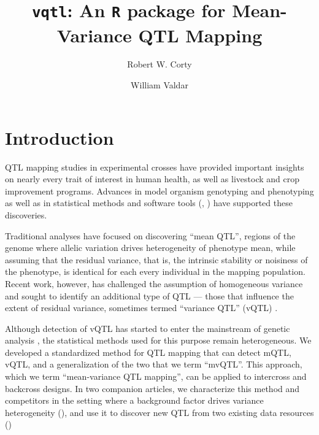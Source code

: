 \documentclass[9pt,twocolumn,twoside]{gsag3jnl}
\title{\texttt{vqtl}: An \texttt{R} package for Mean-Variance QTL Mapping}
\author[$\ast$,1]{Robert W. Corty}
\author[$\ast, 1$]{William Valdar}
\affil[$\ast$]{University of North Carolina at Chapel Hill, Department of Genetics}
\begin{document}
\maketitle
\thispagestyle{firststyle}
\logomark
\articletypemark
\marginmark
\firstpagefootnote
{}
\vspace{-24pt}%



\section*{Introduction}

QTL mapping studies in experimental crosses have provided important insights on nearly every trait of interest in human health, as well as livestock and crop improvement programs.
Advances in model organism genotyping \citep{Williams1990} and phenotyping \citep{Yang2014a} as well as in statistical methods \citep{Lander1989a,Martinez1992} and software tools (\eg, \citealt{Broman2003,Mulligan2017}) have supported these discoveries.

Traditional analyses have focused on discovering ``mean QTL'', regions of the genome where allelic variation drives heterogeneity of phenotype mean, while assuming that the residual variance, that is, the intrinsic stability or noisiness of the phenotype, is identical for each every individual in the mapping population.
Recent work, however, has challenged the assumption of homogeneous variance and sought to identify an additional type of QTL --- those that
influence the extent of residual variance, sometimes termed ``variance QTL'' (vQTL) \citep{Pare2010,Ronnegard2011a,Ronnegard2012,Cao2014}.

Although detection of vQTL has started to enter the mainstream of genetic analysis \citep{Yang2012,Hulse2013,Ayroles2015,Wei2016-lt,Wang2017,Wei2017-tt}, the statistical methods used for this purpose remain heterogeneous.
We developed a standardized method for QTL mapping that can detect mQTL, vQTL, and a generalization of the two that we term ``mvQTL''.
This approach, which we term ``mean-variance QTL mapping'', can be applied to intercross and backcross designs.
In two companion articles, we characterize this method and competitors in the setting where a background factor drives variance heterogeneity (\CortyMethodsPaper), and use it to discover new QTL from two existing data resources (\CortyReanalysisPaper)
\end{document}
